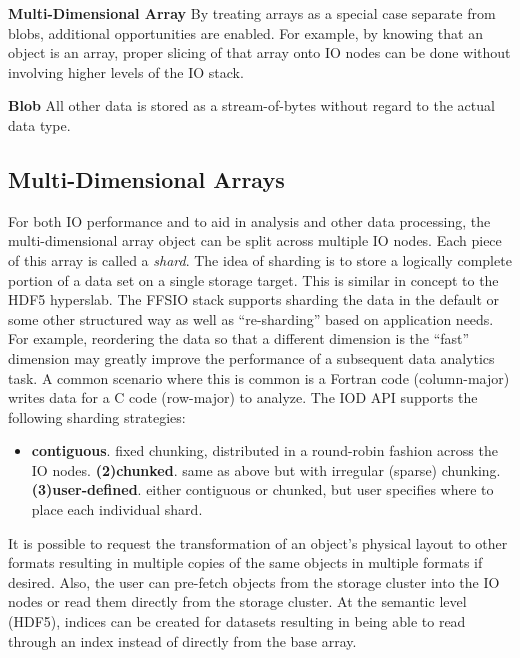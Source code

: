 \documentclass[conference]{IEEEtran} \pdfpagewidth=8.5in
\begin{document}
\textbf{Multi-Dimensional Array}
By treating arrays as a special case separate from blobs, additional
opportunities are enabled. For example, by knowing that an object is an array,
proper slicing of that array onto IO nodes can be done without involving higher
levels of the IO stack.

\textbf{Blob}
All other data is stored as a stream-of-bytes without regard to the actual
data type.

\subsection{Multi-Dimensional Arrays}

For both IO performance and to aid in analysis and other data processing, the
multi-dimensional array object can be split across multiple IO nodes. Each
piece of this array is called a {\em shard}.  The idea of sharding is to store
a logically complete portion of a data set on a single storage target. This is
similar in concept to the HDF5 hyperslab.  The FFSIO stack supports sharding
the data in the default or some other structured way as well as ``re-sharding''
based on application needs. For example, reordering the data so that a
different dimension is the ``fast'' dimension may greatly improve the
performance of a subsequent data analytics task. A common scenario where this
is common is a Fortran code (column-major) writes data for a C code (row-major)
to analyze.  The IOD API supports the following sharding strategies:

\begin{itemize}
\item
  \textbf{contiguous}. fixed chunking, distributed in a round-robin
  fashion across the IO nodes.
  \textbf{(2)chunked}. same as above but with irregular (sparse) chunking.
  \textbf{(3)user-defined}. either contiguous or chunked, but user specifies
  where to place each individual shard.
\end{itemize}

It is possible to request the transformation of an object's physical
layout to other formats resulting in multiple copies of the same objects in
multiple formats if desired. Also, the user can pre-fetch objects from
the storage cluster into the IO nodes or read them directly from the
storage cluster. At the semantic level (HDF5), indices can be created
for datasets resulting in being able to read through an index instead of
directly from the base array.
\end{document}
